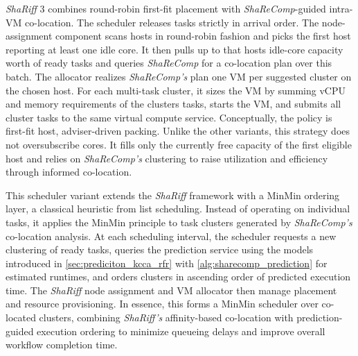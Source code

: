 \textit{ShaRiff} 3 combines round-robin first-fit placement with \textit{ShaReComp}-guided intra-VM co-location. The scheduler releases tasks strictly in arrival order. The node-assignment component scans hosts in round-robin fashion and picks the first host reporting at least one idle core. It then pulls up to that hosts idle-core capacity worth of ready tasks and queries \textit{ShaReComp} for a co-location plan over this batch.
The allocator realizes \textit{ShaReComp's} plan one VM per suggested cluster on the chosen host. For each multi-task cluster, it sizes the VM by summing vCPU and memory requirements of the clusters tasks, starts the VM, and submits all cluster tasks to the same virtual compute service.
Conceptually, the policy is first-fit host, adviser-driven packing. Unlike the other variants, this strategy does not oversubscribe cores. It fills only the currently free capacity of the first eligible host and relies on \textit{ShaReComp's} clustering to raise utilization and efficiency through informed co-location.

This scheduler variant extends the \textit{ShaRiff} framework with a MinMin ordering layer, a classical heuristic from list scheduling. Instead of operating on individual tasks, it applies the MinMin principle to task clusters generated by \textit{ShaReComp's} co-location analysis. At each scheduling interval, the scheduler requests a new clustering of ready tasks, queries the prediction service using the models introduced in \ref{sec:prediciton_kcca_rfr} with \ref{alg:sharecomp_prediction} for estimated runtimes, and orders clusters in ascending order of predicted execution time. The \textit{ShaRiff} node assignment and VM allocator then manage placement and resource provisioning. In essence, this forms a MinMin scheduler over co-located clusters, combining \textit{ShaRiff's} affinity-based co-location with prediction-guided execution ordering to minimize queueing delays and improve overall workflow completion time.

